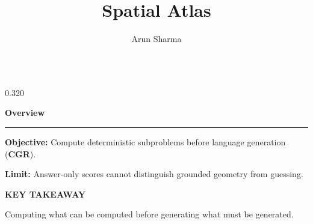 \documentclass{beamer}
\title{Spatial Atlas}
\author{Arun Sharma}
\newenvironment{possection}[2]{%
  \par\vspace{0.10cm}%
  \noindent{\color{ncgreendark}\bfseries\large #1}\hspace{0.42em}%
  {\color{ncink}\bfseries\large #2}\par\vspace{-0.20cm}%
  \noindent\textcolor{ncline}{\rule{\linewidth}{0.9pt}}\par\vspace{0cm}%
  \begin{minipage}{\linewidth}%
}{%
  \end{minipage}\par\vspace{0.40cm}%
}
\newcommand{\heil}[1]{{\color{ncink}\bfseries #1:}\hspace{0.3em}}
\begin{document}
\begin{frame}[t]
\vspace{0.42cm}
\begin{columns}[t,onlytextwidth]

\begin{column}{0.320\textwidth}

  \begin{possection}{1.}{Overview}
    \heil{Objective} Compute deterministic subproblems before language generation
    (\textbf{CGR}).
    \par\vspace{0.14cm}
    \heil{Limit} Answer-only scores cannot distinguish grounded geometry from guessing.
    \par\vspace{0.18cm}
    \begin{takeaway}
      {\ttfamily\footnotesize\bfseries\color{ncgreendark}\MakeUppercase{Key takeaway}}\par
      \vspace{0.18cm}
      {\color{ncink}\normalsize Computing what can be computed before generating what
      must be generated.}
    \end{takeaway}
  \end{possection}


\end{column}
\end{columns}
\end{frame}
\end{document}
